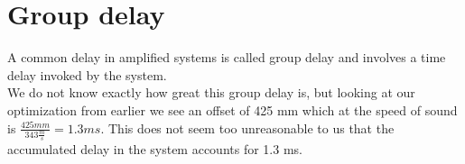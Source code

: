 \section{Group delay}
A common delay in amplified systems is called group delay and involves a time delay invoked by the system. \\
We do not know exactly how great this group delay is, but looking at our optimization from earlier we see an offset of 425 mm which at the speed of sound is  $\frac{425mm}{343\frac{m}{s}}=1.3ms$. This does not seem too unreasonable to us that the accumulated delay in the system accounts for 1.3 ms.\\
